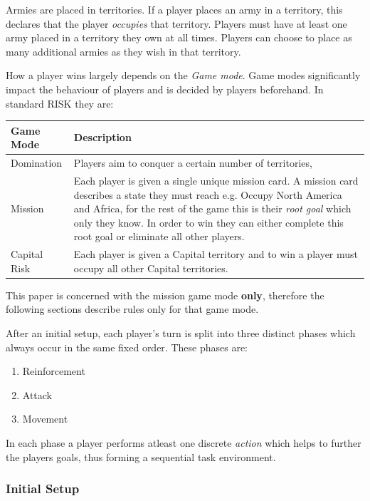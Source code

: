 \documentclass[parskip]{cs4rep}
\begin{document}
Armies are placed in territories. If a player places an army in a territory, this declares that the player \textit{occupies} that territory. Players must have at least one army placed in a territory they own at all times. Players can choose to place as many additional armies as they wish in that territory.

How a player wins largely depends on the \textit{Game mode}. Game modes significantly impact the behaviour of players and is decided by players beforehand. In standard RISK they are:
\newline

\begin{tabular}{|l|p{11cm}|}
\hline 
\textbf{Game Mode} & \textbf{Description} \\ 
\hline 
Domination & Players aim to conquer a certain number of territories, \\ 
\hline 
Mission & Each player is given a single unique mission card. A mission card describes a state they must reach e.g. Occupy North America and Africa, for the rest of the game this is their \textit{root goal} which only they know. In order to win they can either complete this root goal or eliminate all other players. \\ 
\hline 
Capital Risk & Each player is given a Capital territory and to win a player must occupy all other Capital territories. \\ 
\hline
\end{tabular} 
\newline

This paper is concerned with the mission game mode \textbf{only}, therefore the following sections describe rules only for that game mode.

After an initial setup, each player's turn is split into three distinct phases which always occur in the same fixed order. These phases are:

\begin{enumerate}
\item
Reinforcement
\item
Attack
\item
Movement
\newline
\end{enumerate}

In each phase a player performs atleast one discrete \textit{action} which helps to further the players goals, thus forming a sequential task environment.

\subsubsection{Initial Setup}
\end{document}
